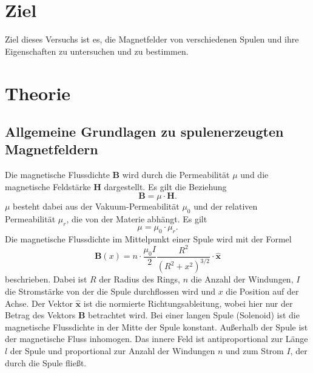 \section{Ziel}
Ziel dieses Versuchs ist es, die Magnetfelder von verschiedenen
Spulen und ihre Eigenschaften zu untersuchen und zu bestimmen. %

\section{Theorie}
\label{sec:Theorie}


\subsection{Allgemeine Grundlagen zu spulenerzeugten Magnetfeldern } %
Die magnetische Flussdichte $\symbf{B}$ wird durch die Permeabilität $\mu$ und die 
magnetische Feldstärke $\symbf{H}$ dargestellt. Es gilt die Beziehung 
\begin{equation} 
    \symbf{B} = \mu \cdot \symbf{H}.
    \label{eqn:B}
\end{equation}
$\mu$ besteht dabei aus der Vakuum-Permeabilität $\mu_{0}$ und der relativen 
Permeabilität $\mu_{r}$, die von der Materie abhängt. 
Es gilt 
\begin{equation*} 
    \mu = \mu_{0} \cdot \mu_{r}.
\end{equation*}
\newline
Die magnetische Flussdichte im Mittelpunkt einer Spule wird mit der Formel 
\begin{equation}
    \symbf{B}(x)= n \cdot \frac{\mu_{0} I}{2} \frac{R^2}{(R^2 +x^2)^{3/2}}\cdot \symbf{\hat{x}}
    \label{eqn:kurzespule}
\end{equation}
beschrieben. 
Dabei ist $R$ der Radius des Rings, $n$ die Anzahl der Windungen, $I$ die Stromstärke von der die Spule durchflossen wird und $x$ die Position auf der Achse.
Der Vektor $\symbf{\hat{x}}$ ist die normierte Richtungsableitung, wobei hier nur der Betrag des Vektors $\symbf{B}$ betrachtet wird.
\newline
Bei einer langen Spule (Solenoid) ist die magnetische Flussdichte in der Mitte der 
Spule konstant. Außerhalb der Spule ist der magnetische Fluss inhomogen. 
Das innere Feld ist antiproportional zur Länge $l$ der Spule und proportional zur Anzahl der Windungen %
$n$ und zum Strom $I$, der durch die Spule fließt. 
